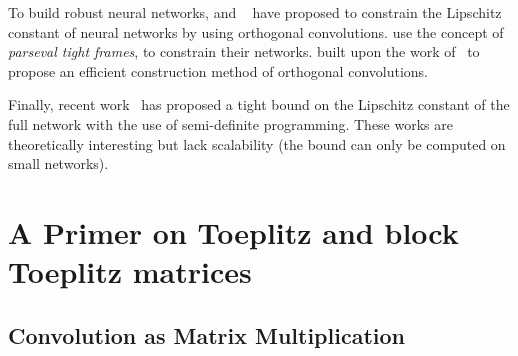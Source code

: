 To build robust neural networks, \citet{cisse2017parseval} and ~\citet{NIPS2019_9673} have proposed to constrain the Lipschitz constant of neural networks by using orthogonal convolutions.
\citet{cisse2017parseval} use the concept of \emph{parseval tight frames}, to constrain their networks.
\citet{NIPS2019_9673} built upon the work of~\citet{cisse2017parseval} to propose an efficient construction method of orthogonal convolutions.  

Finally, recent work~\citet{NIPS2019_9319,latorre2020lipschitz} has proposed a tight bound on the Lipschitz constant of the full network with the use of semi-definite programming.
These works are theoretically interesting but lack scalability (\ie the bound can only be computed on small networks).


\section{A Primer on Toeplitz and block Toeplitz matrices}
\label{section:primer_toeplitz_matrix}

\subsection{Convolution as Matrix Multiplication}\label{section:conv_matrix_multiplication}


